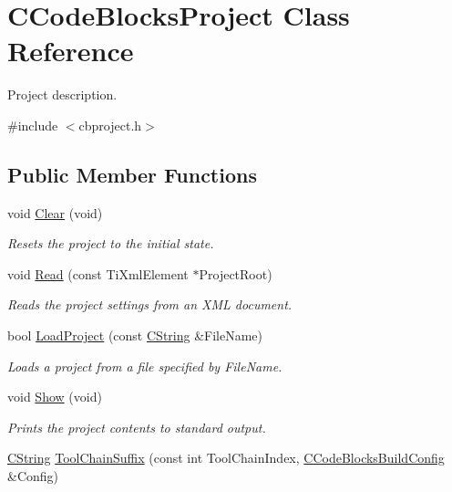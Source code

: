 \hypertarget{classCCodeBlocksProject}{\section{C\-Code\-Blocks\-Project Class Reference}
\label{classCCodeBlocksProject}
}


Project description.  




{\ttfamily \#include $<$cbproject.\-h$>$}

\subsection*{Public Member Functions}
\begin{DoxyCompactItemize}
\item 
void \hyperlink{classCCodeBlocksProject_ab1422bff653b1894ef763b22995b8b8f}{Clear} (void)
\begin{DoxyCompactList}\small\item\em Resets the project to the initial state. \end{DoxyCompactList}\item 
void \hyperlink{classCCodeBlocksProject_ab5c3f6e2fa243705752c027d5e7858aa}{Read} (const Ti\-Xml\-Element $\ast$Project\-Root)
\begin{DoxyCompactList}\small\item\em Reads the project settings from an X\-M\-L document. \end{DoxyCompactList}\item 
bool \hyperlink{classCCodeBlocksProject_a0df219255e8a7831c44556c82799ca2d}{Load\-Project} (const \hyperlink{classCString}{C\-String} \&File\-Name)
\begin{DoxyCompactList}\small\item\em Loads a project from a file specified by {\itshape File\-Name}. \end{DoxyCompactList}\item 
void \hyperlink{classCCodeBlocksProject_ab0d9eceef6233737ccf8c1c5ecedb6fc}{Show} (void)
\begin{DoxyCompactList}\small\item\em Prints the project contents to standard output. \end{DoxyCompactList}\item 
\hyperlink{classCString}{C\-String} \hyperlink{classCCodeBlocksProject_af5f6a96460accd69dbaf8e7d7530b0db}{Tool\-Chain\-Suffix} (const int Tool\-Chain\-Index, \hyperlink{classCCodeBlocksBuildConfig}{C\-Code\-Blocks\-Build\-Config} \&Config)

\end{DoxyCompactItemize}
